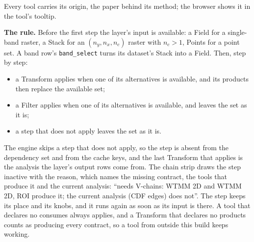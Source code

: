 \documentclass[10pt]{article}
\newcommand{\dev}[1]{\texttt{#1}}
\begin{document}



Every tool carries its origin, the paper behind its method; the browser shows it in the tool's
tooltip.



\textbf{The rule.} Before the first step the layer's input is available: a Field for a
single-band raster, a Stack for an $(n_y,n_x,n_c)$ raster with $n_c>1$, Points for a point
set. A band row's \dev{band\_select} turns its dataset's Stack into a Field. Then, step by
step:
\begin{itemize}\itemsep2pt
  \item a Transform applies when one of its alternatives is available, and its products then
        replace the available set;
  \item a Filter applies when one of its alternatives is available, and leaves the set as it
        is;
  \item a step that does not apply leaves the set as it is.
\end{itemize}
The engine skips a step that does not apply, so the step is absent from the dependency set and
from the cache keys, and the last Transform that applies is the analysis the layer's output
rows come from. The chain strip draws the step inactive with the reason, which names the
missing contract, the tools that produce it and the current analysis: ``needs V-chains: WTMM 2D
and WTMM 2D, ROI produce it; the current analysis (CDF edges) does not''. The step keeps its
place and its knobs, and it runs again as soon as its input is there. A tool that declares no
consumes always applies, and a Transform that declares no products counts as producing every
contract, so a tool from outside this build keeps working.
\end{document}
